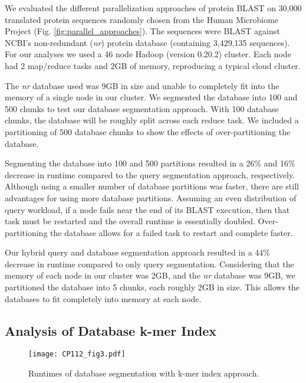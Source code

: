 We evaluated the different parallelization approaches of protein BLAST on 30,000 translated protein sequences randomly chosen from the Human Microbiome Project\cite{peterson2009nih} (Fig. \ref{fig:parallel_approaches}).
The sequences were BLAST against NCBI's non-redundant (\emph{nr}) protein database (containing 3,429,135 sequences).
For our analyses we used a 46 node Hadoop (version 0.20.2) cluster.  Each node had 2 map/reduce tasks and 2GB of memory, reproducing a typical cloud cluster.

The \emph{nr} database used was 9GB in size and unable to completely fit into the memory of a single node in our cluster.
We segmented the database into 100 and 500 chunks to test our database segmentation approach.
With 100 database chunks, the database will be roughly split across each reduce task.
We included a partitioning of 500 database chunks to show the effects of over-partitioning the database.

Segmenting the database into 100 and 500 partitions resulted in a 26\% and 16\% decrease in runtime compared to the query segmentation approach, respectively.
Although using a smaller number of database partitions was faster, there are still advantages for using more database partitions.
Assuming an even distribution of query workload, if a node fails near the end of its BLAST execution, then that task must be restarted and the overall runtime is essentially doubled.
Over-partitioning the database allows for a failed task to restart and complete faster.

Our hybrid query and database segmentation approach resulted in a 44\% decrease in runtime compared to only query segmentation.
Considering that the memory of each node in our cluster was 2GB, and the \emph{nr} database was 9GB, we partitioned the database into 5 chunks, each roughly 2GB in size.
This allows the databases to fit completely into memory at each node.

\subsection{Analysis of Database k-mer Index}


\begin{figure}[!htb]%
\begin{center}
\texttt{[image: CP112\_fig3.pdf]}
\end{center}
\renewcommand{\baselinestretch}{1}
\small\normalsize
\begin{quote}
\caption{Runtimes of database segmentation with k-mer index approach.}
\label{fig:db_index}
\end{quote}
\end{figure}
\renewcommand{\baselinestretch}{2}
\small\normalsize


